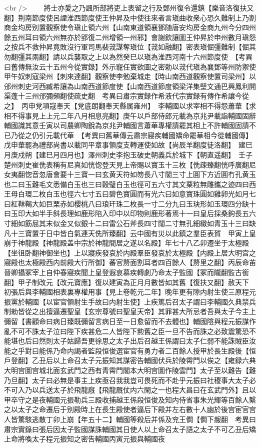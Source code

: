 <br />
　　將士亦愛之乃諷所部將吏上表留之行及鄧州復令還鎮【樂音洛復扶又翻】荆南節度使呂諲淮西節度使王仲昇及中使往來者言瑱曲收衆心恐久難制上乃割商金均房别置觀察使令瑱止領六州【山南東道領襄鄧随唐安均房金商九州今分四州餘五州耳曰領六州無亦於郢復二州增領一州邪】會謝欽讓圍王仲昇於申州數月瑱怨之按兵不救仲昇竟敗沒行軍司馬裴茙謀奪瑱位【茙如融翻】密表瑱倔彊難制【倔其勿翻彊其兩翻】請以兵襲取之上以為然癸巳以瑱為淮西河南十六州節度使　【考異曰舊傳無汝云十五州今從實錄】外示寵任實欲圖之密勅以茙代瑱為襄鄧等州防禦使　甲午奴刺寇梁州【刺來達翻】觀察使李勉棄城走【時山南西道觀察使置司梁州】以邠州刺史河西臧希讓為山南西道節度使【山南西道節度領梁洋集壁文通巴興鳳利開渠蓬十三州邠彌頻翻使疏史翻　考異曰肅宗實録作希液代宗實録有傳作希讓今從之】　丙申党項寇奉天【党底朗翻奉天縣属雍州】　李輔國以求宰相不得怨蕭華【求相不得事見上上元二年八月相息亮翻】庚午以戶部侍郎元載為京兆尹載詣輔國固辭輔國識其意壬寅以司農卿陶銳為京兆尹輔國言蕭華專權請罷其相上不許輔國固請不已乃從之仍引元載代華　【考異曰舊華傳云肅宗寢疾輔國矯命罷華相今從輔國傳】戊申華罷為禮部尚書以載同平章事領度支轉運使如故【尚辰羊翻度徒洛翻】　建巳月庚戍朔【建巳月四月也】澤州刺史李抱玉破史朝義兵於城下【朝直遥翻】　壬子楚州刺史崔侁表稱有尼真如恍惚登天見上帝賜以寶玉十三枚【侁疎臻翻恍呼廣翻尼女夷翻惚音忽唐會要十三寶一曰玄黄天符如笏長八寸䦚三寸上圓下方近圓冇孔黄玉也二曰玉難毛文悉備白玉也三曰穀璧白玉也徑可五六寸其文粟粒無雕鑴之迹四曰西王母白環二枚白玉也徑六七寸五曰碧色寶圓而有光六曰如意寶珠圓如雞卵光如月七曰紅靺鞨大如巨栗赤如櫻桃八曰琅玕珠二枚長一寸二分九曰玉玦形如玉環四分缺十曰玉印大如半手斜長理如鹿形陷入印中以印物則鹿形著焉十一曰皇后採桑鉤長五六寸細如筯屈其末似金又似銀十二曰雷公石斧長四寸闊二寸無孔細緻如青玉十三曰缺凡十三寶置于日中皆白氣連天侁所臻翻】云中國有災以此鎮之羣臣表賀　甲寅上皇崩于神龍殿【神龍殿盖中宗於神龍間居之遂以名殿】年七十八乙卯遷坐于太極殿【坐徂卧翻神御坐也】上以寢疾發哀於内殿羣臣發哀於太極殿【内殿上居大明宫之寢殿也太極殿西内前殿大行所御】蕃官剺面割耳者四百餘人【剺里之翻】丙辰命苖晉卿攝冢宰上自仲春寢疾聞上皇登遐哀慕疾轉劇乃命太子監國【冢而隴翻監古銜翻】甲子制改元【改元寶應】復以建寅為正月月數皆如其舊【復扶又翻】赦天下　初張后與李輔國相表裏專權用事【見上卷乾元二年】晚年更有隙内射生使三原程元振黨於輔國【以宦官領射生手故曰内射生使】上疾篤后召太子謂曰李輔國久典禁兵制勑皆從之出擅逼遷聖皇【玄宗尊號曰聖皇天帝】其罪甚大所忌者吾與太子今主上彌留【書顧命曰病日臻既彌留言病日至一日愈留而不去體也】輔國陰與程元振謀作亂不可不誅太子泣曰陛下疾甚危二人皆陛下勲舊之臣一旦不告而誅之必致震驚恐不能堪也后曰然則太子姑歸吾更徐思之太子出后召越王係謂曰太子仁弱不能誅賊臣汝能之乎對曰能係乃命内謁者監段恒俊選宦官有勇力者二百餘人授甲於長生殿後【恒戶登翻】乙丑后以上命召太子元振知其謀密告輔國伏兵於陵霄門以俟之【雍録六典大明宫圖宫城北面玄武門之西有青霄門閣本大明宫圖作陵雲門】太子至以難告【難乃旦翻】太子曰必無是事主上疾亟召我我豈可畏死而不赴乎元振曰社稷事大太子必不可入乃以兵送太子於飛龍廐【飛龍厩仗内六閑之一也程大昌曰在玄武門外】且以甲卒守之是夜輔國元振勒兵三殿收捕越王係段恒俊及知内侍省事朱光輝等百餘人繫之以太子之命遷后于别殿時上在長生殿使者逼后下殿并左右數十人幽於後宫宦官宫人皆驚駭逃散丁卯上崩【年五十二】輔國等殺后并係及兖王僴【僴下赧翻　考異曰肅宗實錄曰張后因太子監國謀誅輔國其日使人以上命召太子語之太子不可乙丑后矯上命將喚太子程元振知之密告輔國丙寅元振與輔國夜